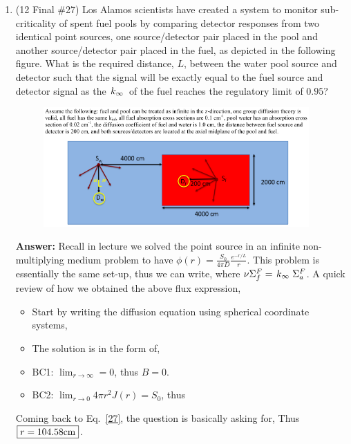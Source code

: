 \documentclass{school-22.211-notes}
\begin{document}
\begin{enumerate}
\item (12 Final \#27) Los Alamos scientists have created a system to monitor sub-criticality of spent fuel pools by comparing detector responses from two identical point sources, one source/detector pair placed in the pool and another source/detector pair placed in the fuel, as depicted in the following figure. What is the required distance, $L$, between the water pool source and detector such that the signal will be exactly equal to the fuel source and detector signal as the $\left. k_{\infty} \right.$ of the fuel reaches the regulatory limit of $0.95$? \\
\begin{figure}[ht]
  \centering
  \includegraphics[width=4in]{images/qual/27.png}
\end{figure}

\textbf{Answer:} Recall in lecture we solved the point source in an infinite non-multiplying medium problem to have $\displaystyle \phi(r) = \frac{S_0}{4 \pi D} \frac{e^{-r/L}}{r}$. This problem is essentially the same set-up, thus we can write, 
where $\nu \Sigma_f^F = \left. k_{\infty} \right. \Sigma_a^F$. A quick review of how we obtained the above flux expression, 
\begin{itemize}
  \item Start by writing the diffusion equation using spherical coordinate systems, 
  \item The solution is in the form of, 
  \item BC1: $\displaystyle \lim_{r\to \infty} = 0$, thus $B = 0$. 
  \item BC2: $\displaystyle \lim_{r\to 0} 4 \pi r^2 J(r) = S_0$, thus 
\end{itemize}
Coming back to Eq.~\ref{27}, the question is basically asking for, 
Thus $\boxed{ r = 104.58 \mathrm{cm}}$. 
\end{enumerate}
\end{document}
